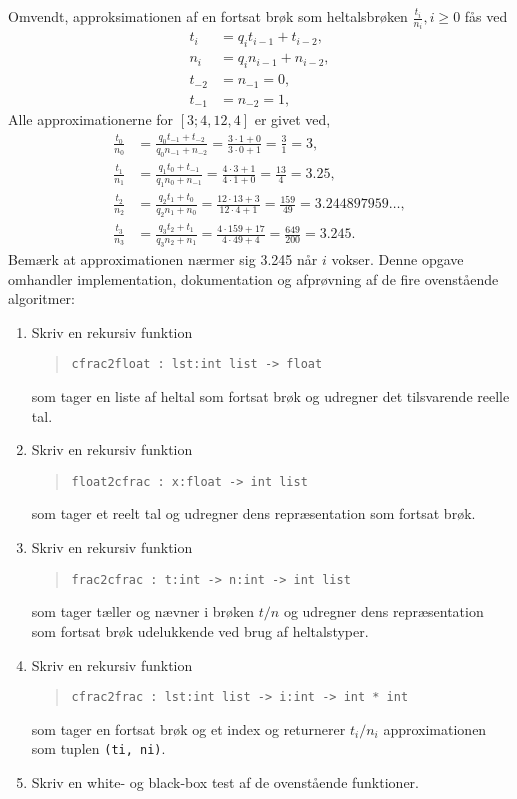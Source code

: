 \documentclass[a4paper,12pt]{article}
\begin{document}
Omvendt, approksimationen af en fortsat brøk som heltalsbrøken $\frac{t_i}{n_i}, i \geq 0$ fås ved
\begin{align}
  t_i &= q_it_{i-1}+t_{i-2},
  \\n_i &= q_in_{i-1}+n_{i-2},
  \\t_{-2} &= n_{-1} = 0,
  \\t_{-1} &= n_{-2} =1,
\end{align}
Alle approximationerne for $[3; 4, 12, 4]$ er givet ved,
\begin{align}
  \frac{t_0}{n_0} &= \frac{q_0t_{-1} + t_{-2}}{q_0n_{-1}+n_{-2}} = \frac{3\cdot 1+0}{3\cdot 0 + 1} = \frac{3}{1} = 3,
  \\\frac{t_1}{n_1} &= \frac{q_1t_0 + t_{-1}}{q_1n_0+n_{-1}} = \frac{4\cdot 3 + 1}{4\cdot 1+0} = \frac{13}{4} = 3.25,
  \\\frac{t_2}{n_2} &= \frac{q_2t_1 + t_{0}}{q_2n_1+n_{0}} = \frac{12\cdot 13 + 3}{12\cdot 4 + 1} = \frac{159}{49} = 3.244897959\ldots,
  \\\frac{t_3}{n_3} &= \frac{q_3t_2 + t_{1}}{q_3n_2+n_{1}} = \frac{4\cdot 159 + 17}{4\cdot 49+4} = \frac{649}{200} = 3.245.
\end{align}
Bemærk at approximationen nærmer sig 3.245 når $i$ vokser.
\newpage
Denne opgave omhandler implementation, dokumentation og afprøvning af de fire ovenstående algoritmer:
\begin{enumerate}[label=6g.\arabic*,start=0]
\item Skriv en rekursiv funktion
  \begin{quote}
    \lstinline{cfrac2float : lst:int list -> float}
  \end{quote}
  som tager en liste af heltal som fortsat brøk og udregner det tilsvarende reelle tal.
\item Skriv en rekursiv funktion
  \begin{quote}
    \lstinline{float2cfrac : x:float -> int list}
  \end{quote}
  som tager et reelt tal og udregner dens repræsentation som fortsat brøk.
\item Skriv en rekursiv funktion
  \begin{quote}
    \lstinline{frac2cfrac : t:int -> n:int -> int list}
  \end{quote}
  som tager tæller og nævner i brøken $t/n$ og udregner dens repræsentation som fortsat brøk udelukkende ved brug af heltalstyper.
\item Skriv en rekursiv funktion
  \begin{quote}
    \lstinline{cfrac2frac : lst:int list -> i:int -> int * int}
  \end{quote}
  som tager en fortsat brøk og et index og returnerer $t_i/n_i$ approximationen som tuplen \lstinline{(ti, ni)}.
\item Skriv en white- og black-box test af de ovenstående funktioner.
\end{enumerate}
\end{document}
